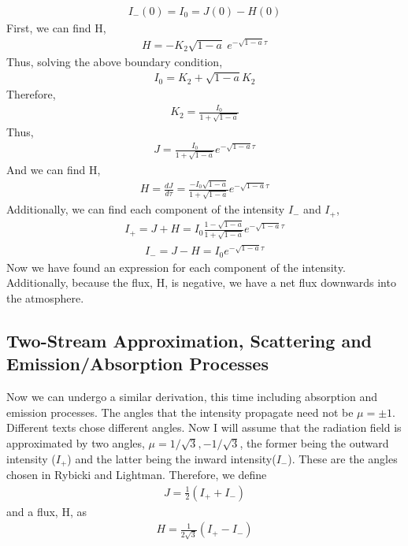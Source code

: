 \documentclass{article}
\begin{document}
 \begin{align}
 I_-(0) = I_0 = J(0) - H(0)
 \end{align}
 First, we can find H,
 \begin{align}
 H = - K_2\sqrt{1-a}\ e^{-\sqrt{1-a}\tau}
 \end{align}
 Thus, solving the above boundary condition,
 \begin{align}
 I_0 = K_2 + \sqrt{1-a} K_2
 \end{align}
 Therefore,
 \begin{align}
 K_2 = \frac{I_0}{1 + \sqrt{1-a}}
 \end{align}
 Thus,
 \begin{align}
 J = \frac{I_0}{1 + \sqrt{1-a}} e^{-\sqrt{1-a}\tau}
 \end{align}
 And we can find H,
 \begin{align}
 H = \frac{dJ}{d \tau} = \frac{-I_0 \sqrt{1-a}}{1 + \sqrt{1-a}} e^{-\sqrt{1-a}\tau}
 \end{align}
 Additionally, we can find each component of the intensity $I_-$ and $I_+$,
 \begin{align}
 I_+ = J + H = I_0 \frac{1 - \sqrt{1-a}}{1 + \sqrt{1-a}}e^{-\sqrt{1-a}\tau}
 \end{align}
 \begin{align}
 I_- = J - H = I_0e^{-\sqrt{1-a}\tau}
 \end{align}
 Now we have found an expression for each component of the intensity. Additionally, because the flux, H, is negative, we have a net flux downwards into the atmosphere.
\subsection*{Two-Stream Approximation, Scattering and Emission/Absorption Processes}

Now we can undergo a similar derivation, this time including absorption and emission processes. The angles that the intensity propagate need not be $\mu = \pm 1$. Different texts chose different angles. 
Now I will  assume that the radiation field is approximated by two angles, $\mu = 1/\sqrt{3}, -1/ \sqrt{3}$, the former being the outward intensity ($I_{+}$) and the latter being the inward intensity($I_{-}$). These are the angles chosen in Rybicki and Lightman. Therefore, we define
\begin{align}
J = \frac{1}{2}(I_{+} + I_{-})
\end{align}
and a  flux, H,  as
\begin{align}
H = \frac{1}{2 \sqrt{3}}(I_{+} - I_{-})
\end{align}
\end{document}
